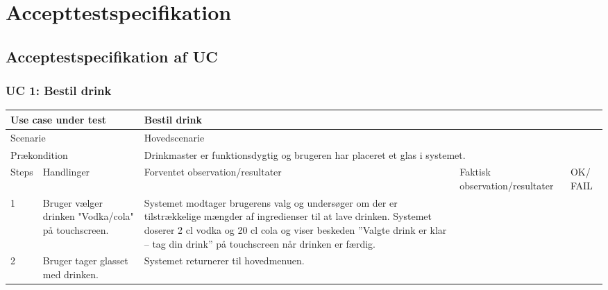 \chapter{Accepttestspecifikation}
\section{Acceptestspecifikation af UC}

\subsection{UC 1: Bestil drink}

\begin{table}[H]
\begin{tabular}{|p{1cm}|p{4cm}|p{4cm}|p{4cm}|p{1cm}|}
\hline
\multicolumn{2}{|p{5cm}|}{Use case under test} & \multicolumn{3}{p{9cm}|}{Bestil drink}                                       \\ \hline
\multicolumn{2}{|p{5cm}|}{Scenarie}            & \multicolumn{3}{p{9cm}|}{Hovedscenarie}                                          \\ \hline
\multicolumn{2}{|p{5cm}|}{Prækondition}        & \multicolumn{3}{p{9cm}|}{Drinkmaster er funktionsdygtig og brugeren har placeret et glas i systemet.}                                 \\ \hline
Steps               & Handlinger          & Forventet observation/resultater & Faktisk observation/resultater & OK/ FAIL \\ \hline
1    & Bruger vælger drinken "Vodka/cola" på touchscreen.  & Systemet modtager brugerens valg og undersøger om der er tilstrækkelige mængder af ingredienser til at lave drinken. Systemet doserer 2 cl vodka og 20 cl cola og viser beskeden ”Valgte drink er klar – tag din drink” på touchscreen når drinken er færdig. &   &         \\ \hline
2    & Bruger tager glasset med drinken.  & Systemet returnerer til hovedmenuen. &   &         \\ \hline

\end{tabular}
\end{table}

